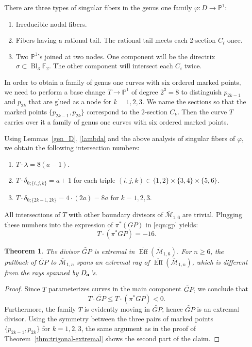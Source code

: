 \documentclass[11]{amsart}
\theoremstyle{plain}
\newtheorem{theorem}{Theorem}[section]
\theoremstyle{definition}
\newcommand{\BM}{\overline{\mathcal M}}
\newcommand{\BEff}{\overline{\operatorname{Eff}}}
\newcommand{\wt}{\widetilde}
\newcommand{\Bl}{\operatorname{Bl}}
\newcommand{\bbF}{\mathbb F}
\newcommand{\bbP}{\mathbb P}
\begin{document}
There are three types of singular fibers in the genus one family $\varphi: D \to \bbP^1$: 
\begin{enumerate}[label={\upshape(\roman*)}]

\item Irreducible nodal fibers. 

\item Fibers having a rational tail. The rational tail meets each $2$-section $C_{i}$ once.

\item Two $\bbP^1$'s joined at two nodes. One component will be the directrix $\sigma \subset \Bl_{3}\bbF_{2}$. The other component will intersect each $C_{i}$ twice.
\end{enumerate}

In order to obtain a family of genus one curves with six ordered marked points, we need to perform a base change $T \to \bbP^1$ of degree $2^3 = 8$ to distinguish $p_{2k-1}$ and $p_{2k}$ that are glued as a node for $k=1,2,3$. 
We name the sections so that the marked points $\{p_{2k-1},p_{2k}\}$ correspond to the $2$-section $C_{k}$. 
Then the curve $T$ carries over it a family of genus one curves with six ordered marked points.  

Using Lemmas~\ref{gen_D}, \ref{lambda} and the above analysis of singular fibers of $\varphi$, we obtain the following intersection numbers: 
\begin{enumerate}[label={\upshape(\roman*)}]
\item $T \cdot \lambda = 8(a-1)$. 
\item $T \cdot \delta_{0;\{i,j,k\}} = a+1$ for each triple $(i,j,k) \in \{1,2\} \times \{3,4\} \times \{5,6\}$. 
\item $T \cdot \delta_{0;\{2k-1,2k\}} = 4 \cdot (2a) = 8a$ for $k = 1, 2, 3$. 
\end{enumerate}

All intersections of $T$ with other boundary divisors of $\BM_{1,6}$ are trivial. Plugging these numbers into the expression of $\pi^{*}(GP)$ in \eqref{eqn:gp} yields: 
\[T\cdot (\pi^{*}GP) = -16.\] 

\begin{theorem}
\label{thm:GP}
The divisor $\wt{GP}$ is extremal in $\BEff(\BM_{1,6})$. For $n\geq 6$, the pullback of 
$\wt{GP}$ to $\BM_{1,n}$ spans an extremal ray of $\BEff(\BM_{1,n})$, which is different from 
the rays spanned by $D_{\bf a}$'s. 
\end{theorem}

\begin{proof}
Since $T$ parameterizes curves in the main component ${\wt{GP}}$, we conclude that 
$$T \cdot {\wt{GP}} \leq T\cdot (\pi^{*}GP) < 0.$$  
Furthermore, the family $T$ is evidently moving in $\wt{GP}$, hence $\wt{GP}$ is an extremal divisor. Using the symmetry between the three pairs of marked points $\{p_{2k-1}, p_{2k}\}$ for $k=1,2,3$, the same argument as in the proof of Theorem~\ref{thm:trigonal-extremal} shows the second part of the claim. 
\end{proof}
\end{document}
